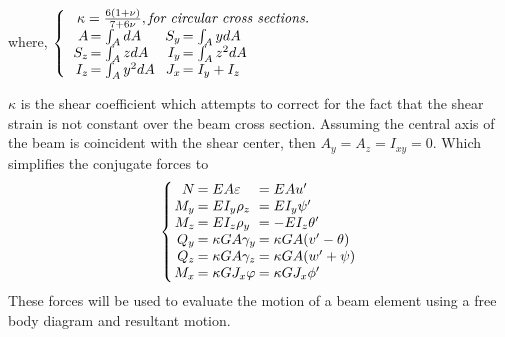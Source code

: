 \begin{center}where, $ \left\{\begin{array}{l}
\ \kappa=\frac{6(1+\nu)}{7+6\nu}, \textit{for circular cross sections.}\\
\arraycolsep=.75pt\begin{array}{rlccccrl}
A&=\int_AdA&&&&&S_y&=\int_A ydA\\
S_z&=\int_AzdA&&&&&I_y&=\int_Az^2dA\\
I_z&=\int_Ay^2dA&&&&&J_x&=I_y+I_z
\end{array}
\end{array}\right. $\\\end{center}
$ \kappa $ is the shear coefficient which attempts to correct for the fact that the shear strain is not constant over the beam cross section. Assuming the central axis of the beam is coincident with the shear center, then $ A_y=A_z=I_{xy}=0 $. Which simplifies the conjugate forces to
\begin{equation}\label{eq:generalizedForcesSimplified}
\left\{\arraycolsep=1pt\begin{array}{rll}
N&=EA\varepsilon&=EAu'\\
M_y&=EI_y\rho_z&=EI_y\psi'\\
M_z&=EI_z\rho_y&=-EI_z\theta'\\
Q_y&=\kappa G A\gamma_y&=\kappa G A(v'-\theta)\\
Q_z&=\kappa G A\gamma_z&=\kappa G A(w'+\psi)\\
M_x&=\kappa G J_x\varphi&=\kappa G J_x\phi'
\end{array}\right.
\end{equation}
These forces will be used to evaluate the motion of a beam element using a free body diagram and resultant motion.\par
